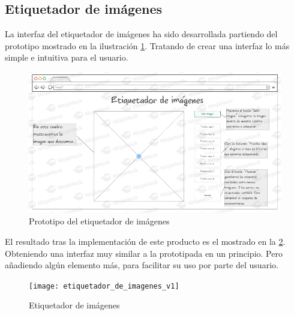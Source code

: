 \subsection{Etiquetador de imágenes}

La interfaz del etiquetador de imágenes ha sido desarrollada partiendo del prototipo mostrado en la ilustración \ref{fig:C.5.2}. Tratando de crear una interfaz lo más simple e intuitiva para el usuario.

\begin{figure}
\centering
\includegraphics[width=0.99\textwidth]{protototipo_etiquetador_de_imagenes}
\caption{Prototipo del etiquetador de imágenes}
\label{fig:C.5.2}
\end{figure}

El resultado tras la implementación de este producto es el mostrado en la \ref{fig:C.5.3}. Obteniendo una interfaz muy similar a la prototipada en un principio. Pero añadiendo algún elemento más, para facilitar su uso por parte del usuario.

\begin{figure}
\centering
\texttt{[image: etiquetador\_de\_imagenes\_v1]}
\caption{Etiquetador de imágenes}
\label{fig:C.5.3}
\end{figure}